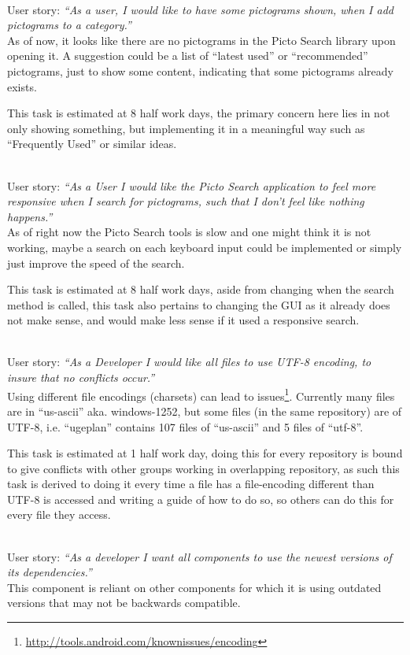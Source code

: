 \begin{description}[style=unboxed]
    \item[Picto Search - It looks like there are no pictograms, until you search for them] \hfill \\ 
        User story: \textit{``As a user, I would like to have some pictograms shown, when I add pictograms to a category.''}\\
        As of now, it looks like there are no pictograms in the Picto Search library upon opening it. 
        A suggestion could be a list of ``latest used'' or ``recommended'' pictograms, just to show some content, indicating that some pictograms already exists.

        This task is estimated at 8 half work days, the primary concern here lies in not only showing something, but implementing it in a meaningful way such as ``Frequently Used'' or similar ideas.
    \item[Picto Search - Responsive Search] \hfill \\
        User story: \textit{``As a User I would like the Picto Search application to feel more responsive when I search for pictograms, such that I don't feel like nothing happens.''} \\
        As of right now the Picto Search tools is slow and one might think it is not working, maybe a search on each keyboard input could be implemented or simply just improve the speed of the search.

        This task is estimated at 8 half work days, aside from changing when the search method is called, this task also pertains to changing the GUI as it already does not make sense, and would make less sense if it used a responsive search.
    \item[General - Use consistent file encoding] \hfill \\
        User story: \textit{``As a Developer I would like all files to use UTF-8 encoding, to insure that no conflicts occur.''} \\
        Using different file encodings (charsets) can lead to issues\footnote{\url{http://tools.android.com/knownissues/encoding}}. 
        Currently many files are in ``us-ascii'' aka. windows-1252, but some files (in the same repository) are of UTF-8, i.e. ``ugeplan'' contains 107 files of ``us-ascii'' and 5 files of ``utf-8''.    

        This task is estimated at 1 half work day, doing this for every repository is bound to give conflicts with other groups working in overlapping repository, as such this task is derived to doing it every time a file has a file-encoding different than UTF-8 is accessed and writing a guide of how to do so, so others can do this for every file they access.
    \item[SequenceViewer - Update dependencies] \hfill \\
        User story: \textit{``As a developer I want all components to use the newest versions of its dependencies.''} \\
        This component is reliant on other components for which it is using outdated versions that may not be backwards compatible.


\end{description}
